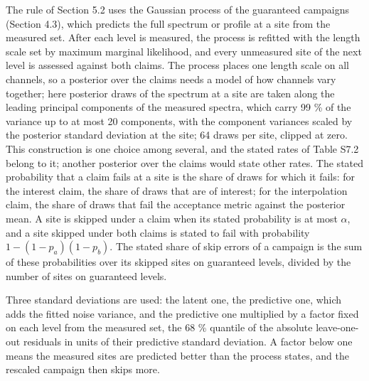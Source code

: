 \documentclass{iopjournal}
\begin{document}
The rule of Section 5.2 uses the Gaussian process of the guaranteed campaigns (Section 4.3), which predicts the full spectrum or profile at a site from the measured set. After each level is measured, the process is refitted with the length scale set by maximum marginal likelihood, and every unmeasured site of the next level is assessed against both claims. The process places one length scale on all channels, so a posterior over the claims needs a model of how channels vary together; here posterior draws of the spectrum at a site are taken along the leading principal components of the measured spectra, which carry 99 \% of the variance up to at most 20 components, with the component variances scaled by the posterior standard deviation at the site; 64 draws per site, clipped at zero. This construction is one choice among several, and the stated rates of Table S7.2 belong to it; another posterior over the claims would state other rates. The stated probability that a claim fails at a site is the share of draws for which it fails: for the interest claim, the share of draws that are of interest; for the interpolation claim, the share of draws that fail the acceptance metric against the posterior mean. A site is skipped under a claim when its stated probability is at most \ensuremath{\alpha}, and a site skipped under both claims is stated to fail with probability \(1 - (1 - p_a)(1 - p_b)\). The stated share of skip errors of a campaign is the sum of these probabilities over its skipped sites on guaranteed levels, divided by the number of sites on guaranteed levels.

Three standard deviations are used: the latent one, the predictive one, which adds the fitted noise variance, and the predictive one multiplied by a factor fixed on each level from the measured set, the 68 \% quantile of the absolute leave-one-out residuals in units of their predictive standard deviation. A factor below one means the measured sites are predicted better than the process states, and the rescaled campaign then skips more.
\end{document}
